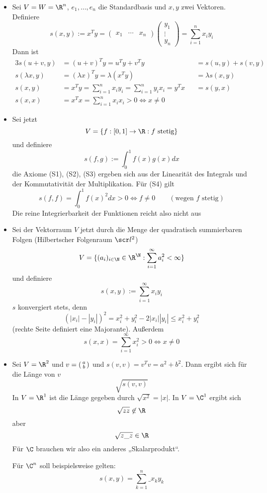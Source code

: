 \documentclass{mycourse}
\newenvironment{psmallmatrix}{\left(\begin{smallmatrix}}{\end{smallmatrix}\right)}
\begin{document}
\begin{ex}
	\begin{itemize}
		\item
			Sei $V=W=\R^n$, $e_1,\dotsc,e_n$ die Standardbasis und $x,y$ zwei Vektoren.
			Definiere
			\[
			s(x,y) := x^Ty = \begin{pmatrix}x_1&\cdots &x_n\end{pmatrix} \begin{pmatrix}y_1\\\vdots\\y_n\end{pmatrix}=\sum_{i=1}^n x_iy_i
			\]
			Dann ist
			\begin{alignat*}{3}
				s(u+v,y) &= (u+v)^T y = u^Ty +v^Ty &&= s(u,y) +s(v,y)\\
		  s(\lambda x,y) &= (\lambda x)^Ty = \lambda(x^T y) &&= \lambda s(x,y)\\
						s(x,y) &= x^Ty =\sum_{i=1}^nx_iy_i = \sum_{i=1}^ny_ix_i = y^Tx &&= s(y,x)\\
				s(x,x) &= x^Tx = \sum_{i=1}^nx_ix_i > 0 \iff x\neq 0
			\end{alignat*}
		\item
			Sei jetzt
			\[
				V=\{f:[0,1]\to \R: f \text{ stetig}\}
			\]
			und definiere
			\[
				s(f,g) := \int_0^1 f(x)g(x) dx
			\]
			die Axiome (S1), (S2), (S3) ergeben sich aus der Linearität des Integrals und der Kommutativität der Multiplikation.
			Für (S4) gilt
			\[
				s(f,f) = \int_0^1f(x)^2 dx > 0 \iff f\neq 0 \qquad (\text{wegen $f$ stetig})
			\]
			Die reine Integrierbarkeit der Funktionen reicht also nicht aus
		\item
			Sei der Vektorraum $V$ jetzt durch die Menge der quadratisch summierbaren Folgen (Hilbertscher Folgenraum $\scr l^2$)
			\[
				V=\{(a_i)_{i\in \N}\in \R^\N : \sum_{i=1}^\infty a_i^2 <\infty\}
			\]
			und definiere
			\[
				s(x,y) := \sum_{i=1}^\infty x_iy_i
			\]
			$s$ konvergiert stets, denn
			\[
				(|x_i| - |y_i|)^2 = x_i^2 +y_i^2 - 2|x_i||y_i| \le x_i^2 +y_i^2
			\]
			(rechte Seite definiert eine Majorante).
			Außerdem
			\[
				s(x,x) = \sum_{i=1}^\infty x_i^2 > 0 \iff x\neq 0
			\]
		\item
			Sei $V=\R^2$ und $v=\begin{psmallmatrix}a\\b\end{psmallmatrix}$ und $s(v,v) = v^Tv = a^2 +b^2$.
			Dann ergibt sich für die Länge von $v$
			\[
				\sqrt{s(v,v)}
			\]
			In $V=\R^1$ ist die Länge gegeben durch $\sqrt{x^2} =|x|$.
			In $V=\C^1$ ergibt sich
			\[
				\sqrt{zz} \not\in \R
			\]
			aber
			\[
				\sqrt{z\_z} \in \R
			\]
			Für $\C$ brauchen wir also ein anderes „Skalarprodukt“.

			Für $\C^n$ soll beispielsweise gelten: 
			\[
				s(x,y) = \sum_{k=1}^n \_x_k y_k
			\]			
	\end{itemize}
\end{ex}
\end{document}
